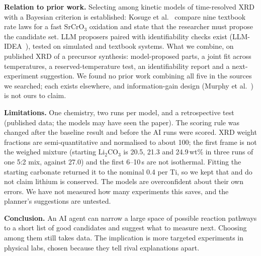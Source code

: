 \documentclass[10pt]{article}
\newcommand{\chem}[1]{\ensuremath{\mathrm{#1}}}
\begin{document}
{\small
\textbf{Relation to prior work.} Selecting among kinetic models of time-resolved XRD with a Bayesian criterion is established: Kosuge et al.~\cite{kosuge2026} compare nine textbook rate laws for a fast $\chem{SrCrO_3}$ oxidation and state that the researcher must propose the candidate set. LLM proposers paired with identifiability checks exist (LLM-IDEA~\cite{shetty2026}), tested on simulated and textbook systems. What we combine, on published XRD of a precursor synthesis: model-proposed parts, a joint fit across temperatures, a reserved-temperature test, an identifiability report and a next-experiment suggestion. We found no prior work combining all five in the sources we searched; each exists elsewhere, and information-gain design (Murphy et al.~\cite{murphy2026}) is not ours to claim.

\textbf{Limitations.} One chemistry, two runs per model, and a retrospective test (published data; the models may have seen the paper). The scoring rule was changed after the baseline result and before the AI runs were scored. XRD weight fractions are semi-quantitative and normalised to about 100; the first frame is not the weighed mixture (starting $\chem{Li_2CO_3}$ is 20.5, 21.3 and 24.9\,wt\% in three runs of one 5:2 mix, against 27.0) and the first 6--10\,s are not isothermal. Fitting the starting carbonate returned it to the nominal 0.4 per Ti, so we kept that and do not claim lithium is conserved. The models are overconfident about their own errors. We have not measured how many experiments this saves, and the planner's suggestions are untested.\par}

\textbf{Conclusion.} An AI agent can narrow a large space of possible reaction pathways to a short list of good candidates and suggest what to measure next. Choosing among them still takes data. The implication is more targeted experiments in physical labs, chosen because they tell rival explanations apart.
\end{document}
